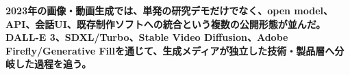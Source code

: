 \noindent\textbf{2023年の画像・動画生成では、単発の研究デモだけでなく、open model、API、会話UI、既存制作ソフトへの統合という複数の公開形態が並んだ。DALL-E 3、SDXL/Turbo、Stable Video Diffusion、Adobe Firefly/Generative Fillを通じて、生成メディアが独立した技術・製品層へ分岐した過程を追う。}\autocite{src-091bbe9dbf4e,src-096341c0ccf6,src-0b410c70bfc7,src-18f22707bf78,src-2b694ab9a461,src-2c97fc5583a3,src-317afaba6510,src-9bc8e7751f80,src-9da0d929aa45,src-a4f61fbe35c5,src-ba80e5e27a11,src-e79065444906}
